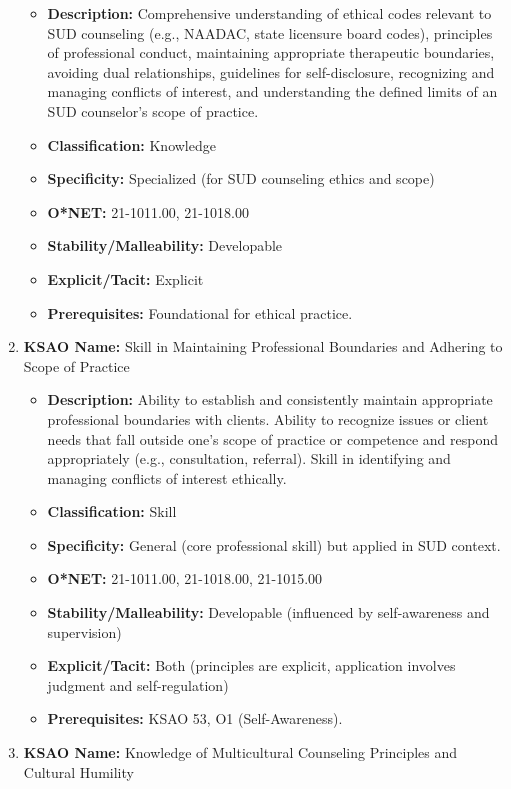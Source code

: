 \documentclass[
  letterpaper,
  DIV=11,
  numbers=noendperiod]{scrartcl}
\providecommand{\tightlist}{%
  \setlength{\itemsep}{0pt}\setlength{\parskip}{0pt}}
\begin{document}
\begin{enumerate}
  \begin{itemize}
  \tightlist
  \item
    \textbf{Description:} Comprehensive understanding of ethical codes
    relevant to SUD counseling (e.g., NAADAC, state licensure board
    codes), principles of professional conduct, maintaining appropriate
    therapeutic boundaries, avoiding dual relationships, guidelines for
    self-disclosure, recognizing and managing conflicts of interest, and
    understanding the defined limits of an SUD counselor's scope of
    practice.
  \item
    \textbf{Classification:} Knowledge
  \item
    \textbf{Specificity:} Specialized (for SUD counseling ethics and
    scope)
  \item
    \textbf{O*NET:} 21-1011.00, 21-1018.00
  \item
    \textbf{Stability/Malleability:} Developable
  \item
    \textbf{Explicit/Tacit:} Explicit
  \item
    \textbf{Prerequisites:} Foundational for ethical practice.
  \end{itemize}
\item
  \textbf{KSAO Name:} Skill in Maintaining Professional Boundaries and
  Adhering to Scope of Practice

  \begin{itemize}
  \tightlist
  \item
    \textbf{Description:} Ability to establish and consistently maintain
    appropriate professional boundaries with clients. Ability to
    recognize issues or client needs that fall outside one's scope of
    practice or competence and respond appropriately (e.g.,
    consultation, referral). Skill in identifying and managing conflicts
    of interest ethically.
  \item
    \textbf{Classification:} Skill
  \item
    \textbf{Specificity:} General (core professional skill) but applied
    in SUD context.
  \item
    \textbf{O*NET:} 21-1011.00, 21-1018.00, 21-1015.00
  \item
    \textbf{Stability/Malleability:} Developable (influenced by
    self-awareness and supervision)
  \item
    \textbf{Explicit/Tacit:} Both (principles are explicit, application
    involves judgment and self-regulation)
  \item
    \textbf{Prerequisites:} KSAO 53, O1 (Self-Awareness).
  \end{itemize}
\item
  \textbf{KSAO Name:} Knowledge of Multicultural Counseling Principles
  and Cultural Humility


\end{enumerate}
\end{document}
